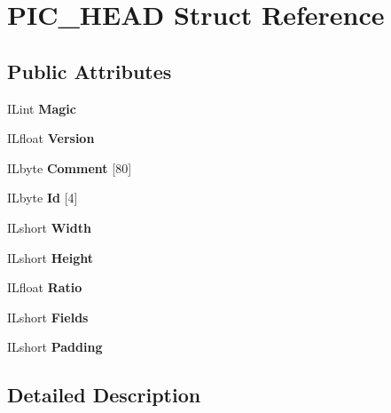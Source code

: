 \hypertarget{structPIC__HEAD}{}\section{P\+I\+C\+\_\+\+H\+E\+AD Struct Reference}
\label{structPIC__HEAD}
\subsection*{Public Attributes}
\begin{DoxyCompactItemize}
\item 
\mbox{\label{structPIC__HEAD_ae7a176d1be8895b26af917d679fa5136}} 
I\+Lint {\bfseries Magic}
\item 
\mbox{\label{structPIC__HEAD_a96bec33e36f9af928b4fd6b42a503637}} 
I\+Lfloat {\bfseries Version}
\item 
\mbox{\label{structPIC__HEAD_a1dd52f5adccb0b3fc404706c0c0888fd}} 
I\+Lbyte {\bfseries Comment} \mbox{[}80\mbox{]}
\item 
\mbox{\label{structPIC__HEAD_a8bad5185fd0e42f7af1c3b737fc6f522}} 
I\+Lbyte {\bfseries Id} \mbox{[}4\mbox{]}
\item 
\mbox{\label{structPIC__HEAD_af30a99863cc47a4923a7e6ee70f8ffc4}} 
I\+Lshort {\bfseries Width}
\item 
\mbox{\label{structPIC__HEAD_af51f0bec7a0fdb19e3399b46e39bede4}} 
I\+Lshort {\bfseries Height}
\item 
\mbox{\label{structPIC__HEAD_a7a652ad020d931f870440df402b4ff13}} 
I\+Lfloat {\bfseries Ratio}
\item 
\mbox{\label{structPIC__HEAD_adb48c1448cff6faf68dc5d138d968350}} 
I\+Lshort {\bfseries Fields}
\item 
\mbox{\label{structPIC__HEAD_a96624ebea71663f89664b7bbb1a12bfb}} 
I\+Lshort {\bfseries Padding}
\end{DoxyCompactItemize}


\subsection{Detailed Description}


